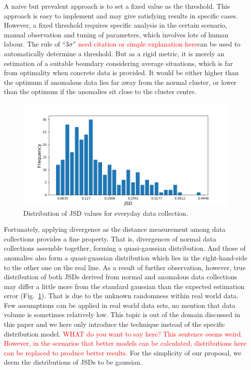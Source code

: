 \documentclass[10pt,conference,letterpaper]{IEEEtran}
\begin{document}
			A naive but prevalent approach is to set a fixed value as the threshold. This approach is easy to implement and may give satisfying results in specific cases. However, a fixed threshold requires specific analysis in the certain scenario, manual observation and tuning of parameters, which involves lots of human labour. The rule of ``$3 \sigma$'' \textcolor{red}{need citation or simple explanation here}can be used to automatically determine a threshold. But as a rigid metric, it is merely an estimation of a suitable boundary considering average situations, which is far from optimality when concrete data is provided. It would be either higher than the optimum if anomalous data lies far away from the normal cluster, or lower than the optimum if the anomalies sit close to the cluster centre.
	
			\begin{figure}[!t]
				\centering
				\includegraphics[width=\linewidth]{fig/JSD-Dist.png}
				\caption{Distribution of JSD values for everyday data collection. }
				\label{fig:jsd-dist}
			\end{figure}
	
			Fortunately, applying divergence as the distance measurement among data collections provides a fine property. That is, divergences of normal data collections assemble together, forming a quasi-gaussian distribution. And those of anomalies also form a quasi-guassian distribution which lies in the right-hand-side to the other one on the real line. As a result of further observation, however, true distribution of both JSDs derived from normal and anomalous data collections may differ a little more from the standard gaussian than the expected estimation error (Fig.~\ref{fig:jsd-dist}). That is due to the unknown randomness within real world data. Few assumptions can be applied in real world data sets, no mention that data volume is sometimes relatively low. This topic is out of the domain discussed in this paper and we here only introduce the technique instead of the specific distribution model. 
\textcolor{red}{WHAT do you want to say here? This sentence seems weird. However, in the scenarios that better models can be calculated, distributions here can be replaced to produce better results. }
For the simplicity of our proposal, we deem the distributions of JSDs to be gaussian.
	
\end{document}
